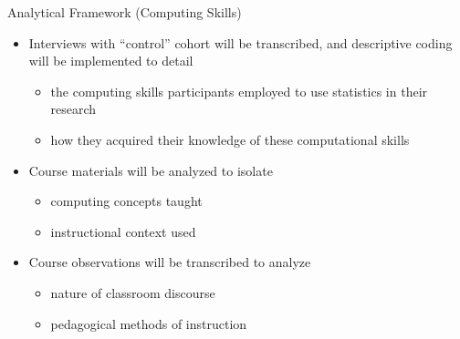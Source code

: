 \documentclass[10pt,ignorenonframetext,]{beamer}
\providecommand{\tightlist}{%
  \setlength{\itemsep}{0pt}\setlength{\parskip}{0pt}}
\begin{document}
\begin{frame}{Analytical Framework (Computing Skills)}

\begin{itemize}[<+->]
\tightlist
\item
  Interviews with ``control'' cohort will be transcribed, and
  descriptive coding will be implemented to detail

  \begin{itemize}[<+->]
  \tightlist
  \item
    the computing skills participants employed to use statistics in
    their research\\
  \item
    how they acquired their knowledge of these computational skills
  \end{itemize}
\item
  Course materials will be analyzed to isolate

  \begin{itemize}[<+->]
  \tightlist
  \item
    computing concepts taught\\
  \item
    instructional context used
  \end{itemize}
\item
  Course observations will be transcribed to analyze

  \begin{itemize}[<+->]
  \tightlist
  \item
    nature of classroom discourse\\
  \item
    pedagogical methods of instruction
  \end{itemize}
\end{itemize}

\end{frame}
\end{document}
